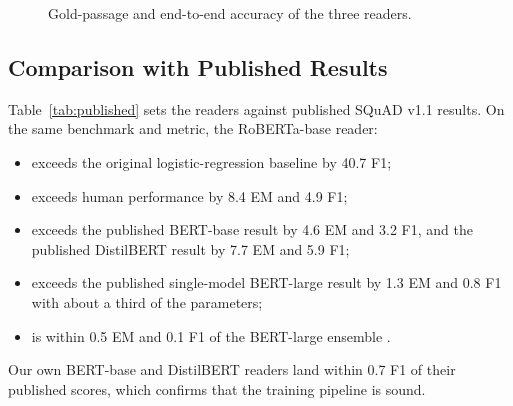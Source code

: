 \documentclass[conference]{IEEEtran}
\begin{document}
\begin{figure}[t]
\centering
{}
\caption{Gold-passage and end-to-end accuracy of the three readers.}
\label{fig:e2e}
\end{figure}

\subsection{Comparison with Published Results}
Table~\ref{tab:published} sets the readers against published SQuAD v1.1 results. On the same
benchmark and metric, the RoBERTa-base reader:
\begin{itemize}
\item exceeds the original logistic-regression baseline \cite{rajpurkar2016} by 40.7 F1;
\item exceeds human performance \cite{rajpurkar2016} by 8.4 EM and 4.9 F1;
\item exceeds the published BERT-base result \cite{devlin2019} by 4.6 EM and 3.2 F1, and the
      published DistilBERT result \cite{sanh2019} by 7.7 EM and 5.9 F1;
\item exceeds the published single-model BERT-large result \cite{devlin2019} by 1.3 EM and
      0.8 F1 with about a third of the parameters;
\item is within 0.5 EM and 0.1 F1 of the BERT-large ensemble \cite{devlin2019}.
\end{itemize}
Our own BERT-base and DistilBERT readers land within 0.7 F1 of their published scores, which
confirms that the training pipeline is sound.
\end{document}
